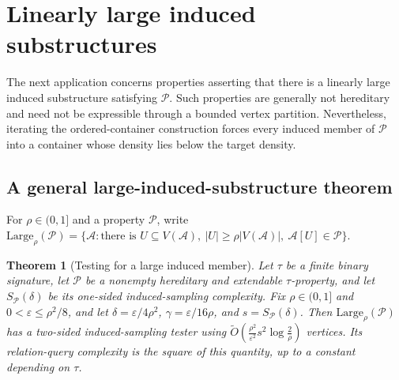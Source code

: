 \documentclass[11pt,reqno,letterpaper]{amsart}
\newcommand{\cA}{{\mathcal A}}
\newcommand{\cP}{{\mathcal P}}
\theoremstyle{plain}
\newtheorem{thm}{Theorem}[section]
\theoremstyle{remark}
\begin{document}
\section{Linearly large induced substructures}
\label{sec:large-induced-applications}

The next application concerns properties asserting that there is a linearly large induced substructure satisfying $\cP$.  Such properties are generally not hereditary and need not be expressible through a bounded vertex partition.  Nevertheless, iterating the ordered-container construction forces every induced member of $\cP$ into a container whose density lies below the target density.

\subsection{A general large-induced-substructure theorem}

For $\rho\in(0,1]$ and a property $\cP$, write
\(\mathrm{Large}_\rho(\cP) =\{\cA:\text{there is }U\subseteq V(\cA),\ |U|\geq\rho|V(\cA)|, \ \cA[U]\in\cP\}.\)

\begin{thm}[Testing for a large induced member]
\label{thm:relational-large-induced}
Let $\tau$ be a finite binary signature, let $\cP$ be a nonempty hereditary
and extendable $\tau$-property, and let $S_{\cP}(\delta)$ be its one-sided
induced-sampling complexity.  Fix $\rho\in(0,1]$ and
$0<\varepsilon\leq\rho^2/8$, and let
\(\delta={\varepsilon}/{4\rho^2}\), \(\gamma={\varepsilon}/{16\rho}\), and \(   s=S_{\cP}(\delta)\).
Then $\mathrm{Large}_\rho(\cP)$ has a two-sided induced-sampling tester using
\(\widetilde O\!\left( \frac{\rho^2}{\varepsilon^2} s^2\log\frac2\rho \right)\)
vertices.  Its relation-query complexity is the square of this quantity, up
to a constant depending on $\tau$.
\end{thm}
\end{document}
